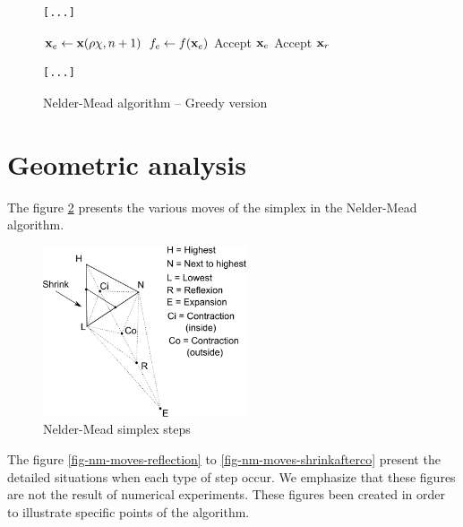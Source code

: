 \begin{figure}[htbp]
\begin{verbatim}
[...]
\end{verbatim}
\begin{algorithmic}
    \STATE $\mathbf{x}_e \gets \mathbf{x}(\rho\chi,n+1)$ 
    \STATE $f_e \gets f(\mathbf{x}_e)$ 
      \STATE Accept $\mathbf{x}_e$
    \ELSE
      \STATE Accept $\mathbf{x}_r$
    \ENDIF
\end{algorithmic}
\begin{verbatim}
[...]
\end{verbatim}
\caption{Nelder-Mead algorithm -- Greedy version}
\label{algo-neldermead-greedy}
\end{figure}


\section{Geometric analysis}

The figure \ref{fig-nm-moves} presents the various moves of the 
simplex in the Nelder-Mead algorithm.

\begin{figure}
\begin{center}
\includegraphics[width=6cm]{nelder-mead-steps.pdf}
\end{center}
\caption{Nelder-Mead simplex steps}
\label{fig-nm-moves}
\end{figure}

The figure \ref{fig-nm-moves-reflection} 
to \ref{fig-nm-moves-shrinkafterco} present the 
detailed situations when each type of step occur.
We emphasize that these figures are not the result of 
numerical experiments. These figures been created in order 
to illustrate specific points of the algorithm.

